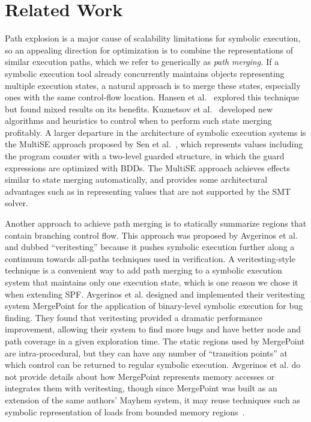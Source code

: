 \section{Related Work}

Path explosion is a major cause of scalability limitations for
symbolic execution, so an appealing direction for optimization is to
combine the representations of similar execution paths, which we refer
to generically as {\em path merging.}
%
If a symbolic execution tool already concurrently maintains objects
representing multiple execution states, a natural approach is to merge
these states, especially ones with the same control-flow location.
%
Hansen et al.~\cite{HansenSS2009} explored this technique but found
mixed results on its benefits.
%
Kuznetsov et al.~\cite{kuznetsov} developed new algorithms and
heuristics to control when to perform such state merging profitably.
%
A larger departure in the architecture of symbolic execution systems
is the MultiSE approach proposed by Sen et al.~\cite{multise}, which
represents values including the program counter with a two-level
guarded structure, in which the guard expressions are optimized with
BDDs.
%
The MultiSE approach achieves effects similar to state merging
automatically, and provides some architectural advantages such as in
representing values that are not supported by the SMT solver.

Another approach to achieve path merging is to statically summarize
regions that contain branching control flow.
%
This approach was proposed by Avgerinos et al.~\cite{veritesting} and
dubbed ``veritesting'' because it pushes symbolic execution further
along a continuum towards all-paths techniques used in verification.
%
A veritesting-style technique is a convenient way to add path merging
to a symbolic execution system that maintains only one execution
state, which is one reason we chose it when extending SPF.
%
Avgerinos et al. designed and implemented their veritesting system
MergePoint for the application of binary-level symbolic execution for
bug finding.
%
They found that veritesting provided a dramatic performance
improvement, allowing their system to find more bugs and have better
node and path coverage in a given exploration time.
%
The static regions used by MergePoint are intra-procedural, but they
can have any number of ``transition points'' at which control can be
returned to regular symbolic execution.
%
Avgerinos et al. do not provide details about how MergePoint
represents memory accesses or integrates them with veritesting, though
since MergePoint was built as an extension of the same authors' Mayhem
system, it may reuse techniques such as symbolic representation of
loads from bounded memory regions~\cite{mayhem}.

